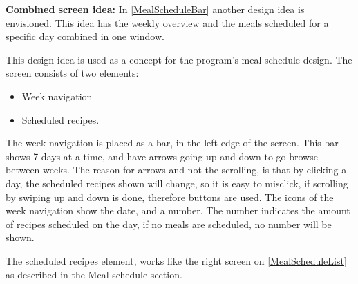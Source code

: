 \textbf{Combined screen idea:} In \cref{MealScheduleBar} another design idea is envisioned. This idea has the weekly overview and the meals scheduled for a specific day combined in one window.

This design idea is used as a concept for the program's meal schedule design. The screen consists of two elements: 

\begin{itemize}
    \item Week navigation
    \item Scheduled recipes.
\end{itemize}

The week navigation is placed as a bar, in the left edge of the screen. This bar shows 7 days at a time, and have arrows going up and down to go browse between weeks. The reason for arrows and not the scrolling, is that by clicking a day, the scheduled recipes shown will change, so it is easy to misclick, if scrolling by swiping up and down is done, therefore buttons are used. The icons of the week navigation show the date, and a number. The number indicates the amount of recipes scheduled on the day, if no meals are scheduled, no number will be shown. 

The scheduled recipes element, works like the right screen on \cref{MealScheduleList} as described in the Meal schedule section.
